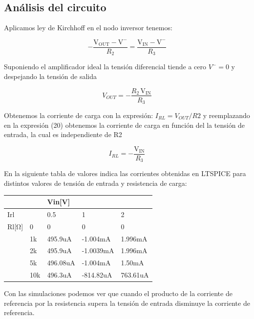 \documentclass[12pt]{article}
\begin{document}
		\subsection{Análisis del circuito}
		Aplicamos ley de Kirchhoff en el nodo inversor tenemos:
		
		\begin{equation}
			-\frac{\mathrm{V_{OUT}}-\mathrm{V^-}}{R_2 }=\frac{\mathrm{V_{IN}}-\mathrm{V^-}}{R_3 }
		\end{equation}
		
		Suponiendo el amplificador ideal la tensión diferencial tiende a cero ${V^-}=0$ y despejando 
		la tensión de salida
		
		\begin{equation}
			{V_{OUT}}=-\frac{R_2 \,\mathrm{V_{IN}}}{R_3 }
		\end{equation}
		
		Obtenemos la corriente de carga con la expresión: $I_{RL}=V_{OUT}/R2$ y reemplazando en la expresión
		(20) obtenemos la corriente de carga en función del la tensión de entrada, la cual es independiente
		de R2
		
		\begin{equation}
			{I_{RL}}=-\frac{\mathrm{V_{IN}}}{R_3 }
		\end{equation} 
		
		En la siguiente tabla de valores indica las corrientes obtenidas en LTSPICE para distintos
		valores de tensión de entrada y resistencia de carga:
		\begin{table}[!ht]
			\centering
			\begin{tabular}{|l|l|l|l|l|}
				\hline
				~ & ~ & Vin[V] & ~ & ~ \\ \hline
				Irl & ~ & 0.5 & 1 & 2 \\ \hline
				Rl[Ω] & 0 & 0 & 0 & 0 \\ \hline
				~ & 1k & 495.9uA & -1.004mA & 1.996mA \\ \hline
				~ & 2k & 495.9uA & -1.0039mA & 1.996mA \\ \hline
				~ & 5k & 496.08uA & -1.004mA & 1.50mA \\ \hline
				~ & 10k & 496.3uA & -814.82uA & 763.61uA \\ \hline
			\end{tabular}
		\end{table}
	Con las simulaciones podemos ver que cuando el producto de la corriente de referencia por la resistencia supera la tensión de entrada disminuye la corriente de referencia.
		
\end{document}
